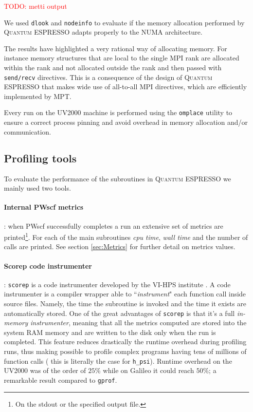 \documentclass[a4paper,12pt]{article}
\newcommand\mynotes[1]{\begin{flushright}

\textcolor{red}{TODO: #1}\end{flushright}}
\newcommand\QE{\textsc{Quantum} ESPRESSO }
\begin{document}
\mynotes{metti output}

We used \texttt{dlook} and \texttt{nodeinfo} to evaluate if the memory allocation performed by \QE adapts properly to the NUMA architecture.

The results have highlighted a very rational way of allocating memory.
For instance memory structures that are local to the single MPI rank are allocated within the rank and not allocated outside the rank and then passed with \texttt{send/recv} directives.
This is a consequence of the design of \QE that makes wide use of all-to-all MPI directives, which are efficiently implemented by MPT.

\begin{framed}
	Every run on the UV2000 machine is performed using the \texttt{omplace} utility to ensure a correct process pinning and avoid overhead in memory allocation and/or communication.
\end{framed}


\newpage



\subsection{Profiling tools}\label{sec:profTools}

To evaluate the performance of the subroutines in \QE we mainly used two tools.

\paragraph{Internal PWscf metrics}: when PWscf successfully completes a run an extensive set of metrics are printed\footnote{On the stdout or the specified output file.}. 
For each of the main subroutines  \textit{cpu time}, \textit{wall time} and the number of calls are printed.
See section \ref{sec:Metrics} for further detail on metrics values.

\paragraph{Scorep code instrumenter}: \texttt{scorep}\cite{SCOREPManual} is a code instrumenter developed by the VI-HPS institute \cite{VH}. 
A code instrumenter is a compiler wrapper able to ``\textit{instrument}" each function call inside source files.
Namely, the time the subroutine is invoked and the time it exists are automatically stored.
One of the great advantages of \texttt{scorep} is that it's a full \textit{in-memory instrumenter}, meaning that all the metrics computed are stored into the system RAM memory and are written to the disk only when the run is completed.
This feature reduces drastically the runtime overhead during profiling runs, thus making possible to profile complex programs having tens of millions of function calls ( this is literally the case for \texttt{h\_psi}).
Runtime overhead on the UV2000 was of the order of $25\%$ while on Galileo it could reach $50\%$; a remarkable result compared to \texttt{gprof}.
\end{document}
